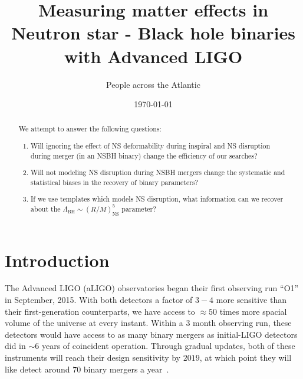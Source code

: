\documentclass[aps,prd,amsmath,floats,floatfix, twocolumn,
superscriptaddress,nofootinbib,showpacs]{revtex4-1}
\begin{document}
\title{
Measuring matter effects in Neutron star - Black hole binaries with Advanced LIGO
}

\author{People across the Atlantic}

\date{\today}

\begin{abstract}
We attempt to answer the following questions: 
\begin{enumerate}
 \item Will ignoring the effect of NS deformability during inspiral and NS disruption during merger (in an NSBH binary) change the efficiency of our searches?
 \item Will not modeling NS disruption during NSBH mergers change the systematic and 
 statistical biases in the recovery of binary parameters?
 \item If we use templates which models NS disruption, what information can we recover about
 the $\Lambda_\mathrm{BH}\sim (R/M)^5_\mathrm{NS}$ parameter?
\end{enumerate}
\end{abstract}

\pacs{}

\maketitle

\section{Introduction}

The Advanced LIGO (aLIGO) observatories began their first observing run ``O1'' in 
September, 2015. With both detectors a factor of $3-4$ more sensitive than
their first-generation counterparts, we have access to $\approx 50$ times more 
spacial volume of the universe at every instant. Within a 
$3$ month observing run, these detectors would have access to as
many binary mergers as initial-LIGO detectors did in $\sim 6$ years of 
coincident operation. Through gradual updates, both of these instruments will
reach their design sensitivity by $2019$, at which point they will like detect
around $70$ binary mergers a year~\cite{Abadie:2010cf}.
\end{document}
